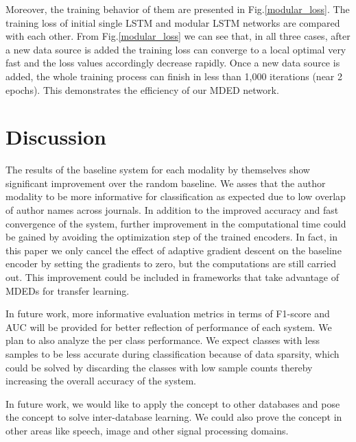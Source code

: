 \documentclass[12pt]{article}
\begin{document}
Moreover, the training behavior of them are presented in Fig.\ref{modular_loss}. The  training loss of initial single LSTM and modular LSTM networks are compared with each other. From Fig.\ref{modular_loss} we can see that, in all three cases, after a new data source is added the training loss can converge to a local optimal very fast and the loss values accordingly decrease rapidly. Once a new data source is added, the whole training process can finish in less than 1,000 iterations (near 2 epochs). This demonstrates the efficiency of our MDED network.


\section{Discussion}\label{discussion}
The results of the baseline system for each modality by themselves show significant improvement over the random baseline. We asses that the author modality to be more informative for classification as expected due to low overlap of author names across journals. In addition to the improved accuracy and fast convergence of the system, further improvement in the computational time could be gained by avoiding the optimization step of the trained encoders. In fact, in this paper we only cancel the effect of adaptive gradient descent on the baseline encoder by setting the gradients to zero, but the computations are still carried out. This improvement could be included in frameworks that take advantage of MDEDs for transfer learning.

In future work, more informative evaluation metrics in terms of F1-score and AUC will be provided for better reflection of performance of each system. We plan to also analyze the per class performance. We expect classes with less samples to be less accurate during classification because of data sparsity, which could be solved by discarding the classes with low sample counts thereby increasing the overall accuracy of the system. 

In future work, we would like to apply the concept to other databases and pose the concept to solve inter-database learning. We could also prove the concept in other areas like speech, image and other signal processing domains.

 


\newpage
\end{document}
